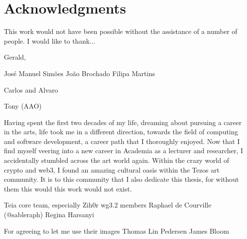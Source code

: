 \chapter*{Acknowledgments}

This work would not have been possible without the assistance of a number of people. I would like to thank...

Gerald,

José Manuel Simões
João Brochado
Filipa Martins

Carlos and Alvaro

Tony (AAO)


Having spent the first two decades of my life, dreaming about pursuing a career in the arts, life took me in a different direction, towards the field of computing and software development, a career path that I thoroughly enjoyed. Now that I find myself veering into a new career in Academia as a lecturer and researcher, I accidentally stumbled across the art world again. Within the crazy world of crypto and web3, I found an amazing cultural oasis within the Tezos art community. It is to this community that I also dedicate this thesis, for without them this would this work would not exist. 


Teia core team, especially Zih0r
wg3.2 members
Raphael de Courville (@sableraph)
Regina Harsanyi

For agreeing to let me use their images
Thomas Lin Pedersen
James Bloom


